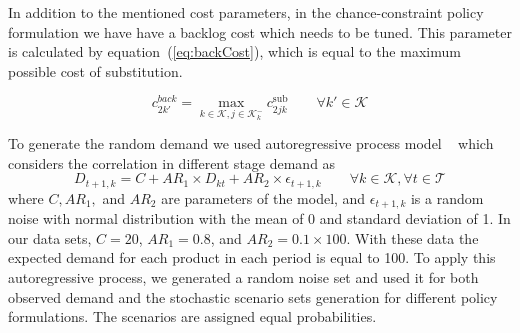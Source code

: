 \documentclass[10pt]{article}
\newcommand{\ti}{t} %
\newcommand{\TI}{\mathcal{T}}
\newcommand{\Ti}{T}
\newcommand{\ka}{k} %
\newcommand{\KA}{\mathcal{K}}
\newcommand{\Ka}{K}
\newcommand{\jey}{j} %
\newcommand{\Psub}{\mathcal{K}^-_k}
\begin{document}

In addition to the mentioned cost parameters, in the chance-constraint policy formulation we have have a backlog cost which needs to be tuned. This parameter is calculated by equation~(\ref{eq:backCost}), which is equal to the maximum possible cost of substitution.
 
\begin{equation}
c^{back}_{ 2 \ka'} = \max_{\ka \in \KA ,\jey \in \Psub }c^{\text{sub}}_{2 \jey \ka  }  \qquad \forall \ka'  \in \KA       \label{eq:backCost}
\end{equation} 


To generate the random demand we used autoregressive process model ~\cite{jiang2017production} which considers the correlation in different stage demand as  
\begin{equation}
D_{ \ti+1,\ka} = C + AR_1 \times D_{ \ka \ti} + AR_2 \times \epsilon_{\ti+1,\ka }  \qquad \forall \ka  \in \KA , \forall \ti \in \TI       \label{eq:AR1}
\end{equation}
where $C, AR_1,$ and $AR_2$ are parameters of the model, and $\epsilon_{ \ti+1,\ka}$ is a random noise with normal distribution with the mean of 0 and standard deviation of 1. 
In our data sets, $C = 20$, $AR_1 = 0.8$, and $AR_2 = 0.1 \times 100$. With these data the expected demand for each product in each period is equal to 100. To apply this autoregressive process, we generated a random noise set and used it for both observed demand and the stochastic scenario sets generation for different policy formulations. The scenarios are assigned equal probabilities.
\end{document}
